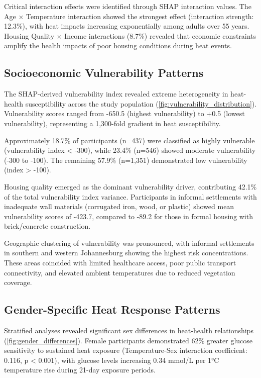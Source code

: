 \documentclass[journal,article,submit,pdftex,moreauthors]{Definitions/mdpi}
\begin{document}
Critical interaction effects were identified through SHAP interaction values. The Age × Temperature interaction showed the strongest effect (interaction strength: 12.3\%), with heat impacts increasing exponentially among adults over 55 years. Housing Quality × Income interactions (8.7\%) revealed that economic constraints amplify the health impacts of poor housing conditions during heat events.

\subsection{Socioeconomic Vulnerability Patterns}

The SHAP-derived vulnerability index revealed extreme heterogeneity in heat-health susceptibility across the study population (\cref{fig:vulnerability_distribution}). Vulnerability scores ranged from -650.5 (highest vulnerability) to +0.5 (lowest vulnerability), representing a 1,300-fold gradient in heat susceptibility.

Approximately 18.7\% of participants (n=437) were classified as highly vulnerable (vulnerability index < -300), while 23.4\% (n=546) showed moderate vulnerability (-300 to -100). The remaining 57.9\% (n=1,351) demonstrated low vulnerability (index > -100).

Housing quality emerged as the dominant vulnerability driver, contributing 42.1\% of the total vulnerability index variance. Participants in informal settlements with inadequate wall materials (corrugated iron, wood, or plastic) showed mean vulnerability scores of -423.7, compared to -89.2 for those in formal housing with brick/concrete construction.

Geographic clustering of vulnerability was pronounced, with informal settlements in southern and western Johannesburg showing the highest risk concentrations. These areas coincided with limited healthcare access, poor public transport connectivity, and elevated ambient temperatures due to reduced vegetation coverage.

\subsection{Gender-Specific Heat Response Patterns}

Stratified analyses revealed significant sex differences in heat-health relationships (\cref{fig:gender_differences}). Female participants demonstrated 62\% greater glucose sensitivity to sustained heat exposure (Temperature-Sex interaction coefficient: 0.116, p < 0.001), with glucose levels increasing 0.34 mmol/L per 1°C temperature rise during 21-day exposure periods.
\end{document}
